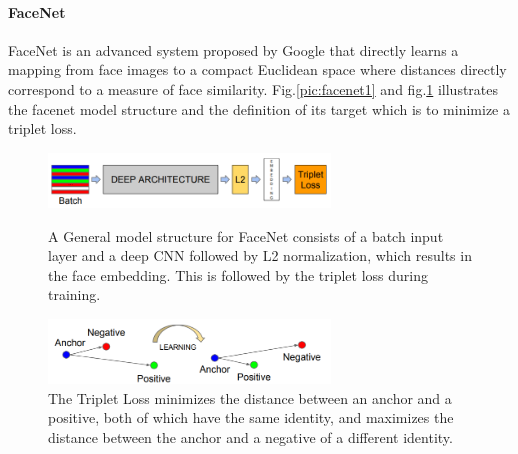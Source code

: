 \paragraph{FaceNet}
FaceNet \cite{schroff2015facenet} is an advanced system proposed by Google that directly learns a mapping from face images to a compact Euclidean space where distances
directly correspond to a measure of face similarity. Fig.\ref{pic:facenet1} and fig.\ref{pic:facenet2} illustrates the facenet model structure and the definition of its target which is to minimize a triplet loss. 
\begin{figure}[H]
    \begin{minipage}[t]{0.47\textwidth}
        \centering\includegraphics[width=7.5cm]{./figures/facenet1.png}
        \caption{A General model structure for FaceNet consists of a batch input layer and a deep CNN followed by L2 normalization, which results in the face embedding. This is followed by the triplet loss during training.}
        \label{pic:facenet1}
    \end{minipage}
    \qquad
    \begin{minipage}[t]{0.47\textwidth}
        \centering\includegraphics[width=7.5cm]{./figures/facenet2.png}
        \caption{The Triplet Loss minimizes the distance between an anchor and a positive, both of which have the same identity, and maximizes the distance between the anchor and a negative of a different identity.}
        \label{pic:facenet2}
    \end{minipage}
\end{figure}

